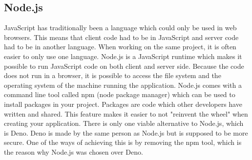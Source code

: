 \subsection{Node.js}
JavaScript has traditionally been a language which could only be used in web browsers. This means that client code had to be in JavaScript and server code had to be in another language. When working on the same project, it is often easier to only use one language. Node.js\cite{nodejs} is a JavaScript runtime which makes it possible to run JavaScript code on both client and server side. Because the code does not run in a browser, it is possible to access the file system and the operating system of the machine running the application. Node.js comes with a command line tool called npm\cite{npm} (node package manager) which can be used to install packages in your project. Packages are code which other developers have written and shared. This feature makes it easier to not "reinvent the wheel" when creating your application. There is only one viable alternative to Node.js, which is Deno\cite{deno}. Deno is made by the same person as Node.js but is supposed to be more secure. One of the ways of achieving this is by removing the npm tool, which is the reason why Node.js was chosen over Deno.